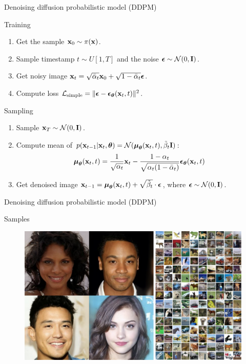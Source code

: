 \begin{frame}{Denoising diffusion probabilistic model (DDPM)}
	\begin{block}{Training}
		\begin{enumerate}
			\item Get the sample $\mathbf{x}_0 \sim \pi(\mathbf{x})$.
			\item Sample timestamp $t \sim U[1, T]$ and the noise $\boldsymbol{\epsilon} \sim \mathcal{N}(0, \mathbf{I})$.
			\item Get noisy image $\mathbf{x}_t = \sqrt{\bar{\alpha}_t} \mathbf{x}_0 + \sqrt{1 - \bar{\alpha}_t} \boldsymbol{\epsilon}$.
			\item Compute loss $ \mathcal{L}_{\text{simple}} = \| \boldsymbol{\epsilon} - \boldsymbol{\epsilon}_{\boldsymbol{\theta}}(\mathbf{x}_t , t) \|^2 $.
		\end{enumerate}
	\end{block}
	\begin{block}{Sampling}
		\begin{enumerate}
			\item Sample $\mathbf{x}_T \sim \mathcal{N}(0, \mathbf{I})$.
			\item Compute mean of $p(\mathbf{x}_{t-1} | \mathbf{x}_t, \boldsymbol{\theta}) = \mathcal{N}(\boldsymbol{\mu}_{\boldsymbol{\theta}}(\mathbf{x}_t, t), \tilde{\beta}_t \mathbf{I})$:
			\[
				\boldsymbol{\mu}_{\boldsymbol{\theta}}(\mathbf{x}_t, t) = \frac{1}{\sqrt{\alpha_t}} \mathbf{x}_t - \frac{1 - \alpha_t}{\sqrt{\alpha_t (1 - \bar{\alpha}_t)}} \boldsymbol{\epsilon}_{\boldsymbol{\theta}}(\mathbf{x}_t, t)
			\]
			\vspace{-0.3cm}
			\item Get denoised image $\mathbf{x}_{t - 1} = \boldsymbol{\mu}_{\boldsymbol{\theta}}(\mathbf{x}_t, t) +  \sqrt{\tilde{\beta}_t} \cdot \boldsymbol{\epsilon}$, where $\boldsymbol{\epsilon} \sim \mathcal{N}(0, \mathbf{I})$.
		\end{enumerate}
	\end{block}
\end{frame}
\begin{frame}{Denoising diffusion probabilistic model (DDPM)}
	\begin{block}{Samples}
		\begin{figure}
			\includegraphics[width=\linewidth]{figs/ddpm_samples}
		\end{figure}
	\end{block}
\end{frame}
